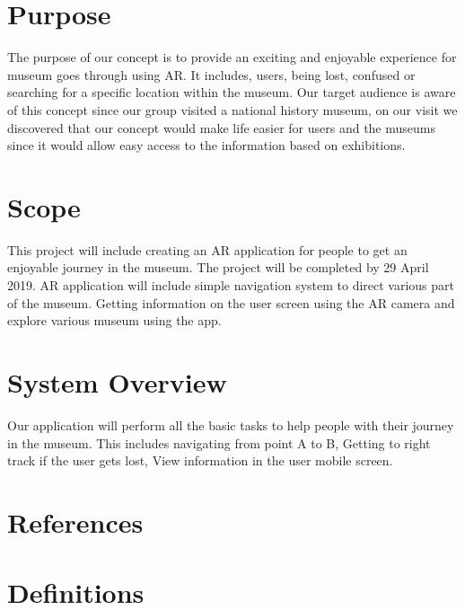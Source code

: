 
\section{Purpose}
The purpose of our concept is to provide an exciting and enjoyable experience for museum goes through using AR. It includes, users, being lost, confused or searching for a specific location within the museum. Our target audience is aware of this concept since our group visited a national history museum, on our visit we discovered that our concept would make life easier for users and the museums since it would allow easy access to the information based on exhibitions.

\section{Scope}
This project will include creating an AR application for people to get an enjoyable journey in the museum. The project will be completed by 29 April 2019. AR application will include simple navigation system to direct various part of the museum. Getting information on the user screen using the AR camera and explore various museum using the app. 

\section{System Overview}
Our application will perform all the basic tasks to help people with their journey in the museum. This includes navigating from point A to B, Getting to right track if the user gets lost, View information in the user mobile screen.

\section{References}

\section{Definitions}

